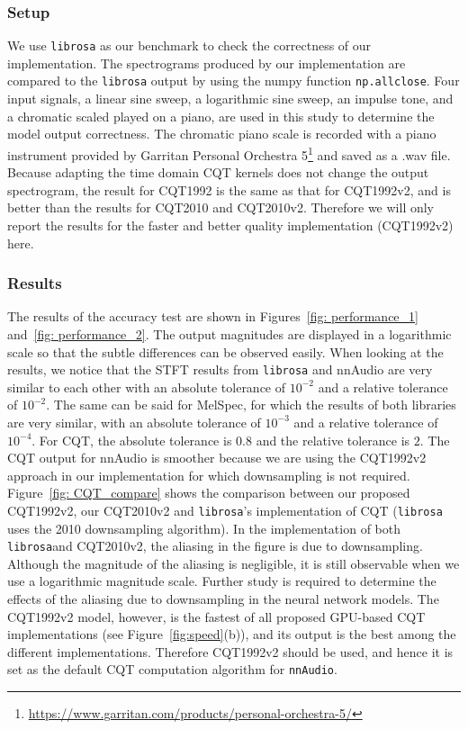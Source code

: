 \documentclass{ieeeaccess}
\newcommand{\nbh}[1]{\texttt{#1}}
\begin{document}
\subsubsection{Setup}
We use \nbh{librosa} as our benchmark to check the correctness of our implementation. The spectrograms produced by our implementation are compared to the \nbh{librosa} output by using the numpy function \nbh{np.allclose}. Four input signals, a linear sine sweep, a logarithmic sine sweep, an impulse tone, and a chromatic scaled played on a piano, are used in this study to determine the model output correctness. The chromatic piano scale is recorded with a piano instrument provided by Garritan Personal Orchestra 5\footnote{\url{https://www.garritan.com/products/personal-orchestra-5/}} and saved as a .wav file. Because adapting the time domain CQT kernels does not change the output spectrogram, the result for CQT1992 is the same as that for CQT1992v2, and is better than the results for CQT2010 and CQT2010v2. Therefore we will only report the results for the faster and better quality implementation (CQT1992v2) here.



\subsubsection{Results}
The results of the accuracy test are shown in Figures~\ref{fig: performance_1} and~\ref{fig: performance_2}. The output magnitudes are displayed in a logarithmic scale so that the subtle differences can be observed easily. When looking at the results, we notice that the STFT results from \nbh{librosa} and nnAudio are very similar to each other with an absolute tolerance of $10^{-2}$ and a relative tolerance of $10^{-2}$. The same can be said for MelSpec, for which the results of both libraries are very similar, with an absolute tolerance of $10^{-3}$ and a relative tolerance of $10^{-4}$. For CQT, the absolute tolerance is $0.8$ and the relative tolerance is $2$. The CQT output for nnAudio is smoother because we are using the CQT1992v2 approach in our implementation for which downsampling is not required. Figure~\ref{fig: CQT_compare} shows the comparison between our proposed CQT1992v2, our CQT2010v2 and \nbh{librosa}'s implementation of CQT (\nbh{librosa} uses the 2010 downsampling algorithm). In the implementation of both \nbh{librosa}and CQT2010v2, the aliasing in the figure is due to downsampling. Although the magnitude of the aliasing is negligible, it is still observable when we use a logarithmic magnitude scale. Further study is required to determine the effects of the aliasing due to downsampling in the neural network models. The CQT1992v2 model, however, is the fastest of all proposed GPU-based CQT implementations (see Figure~\ref{fig:speed}({b})), and its output is the best among the different implementations. Therefore CQT1992v2 should be used, and hence it is set as the default CQT computation algorithm for \nbh{nnAudio}.
\end{document}
